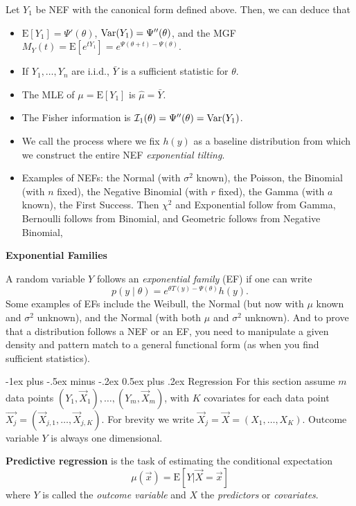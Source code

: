 \documentclass[10pt,landscape]{article}
\makeatletter
\renewcommand{\section}{\@startsection{section}{1}{0mm}%
                                {-1ex plus -.5ex minus -.2ex}%
                                {0.5ex plus .2ex}%
                                {\normalfont\large\bfseries}}
\newcommand{\E}{\text{E}}
\makeatother
\begin{document}
\begin{multicols*}{3}
Let $Y_1$ be NEF with the canonical form defined above. Then, we can deduce that 
\begin{itemize}
    \item $\E [Y_1]=\Psi'(\theta)$, $\operatorname{Var}( Y_1)=\Psi''(\theta)$, and the MGF $M_Y(t)=\E[e^{tY_1}]=e^{\Psi(\theta+t)-\Psi(\theta)}$.
    \item If $Y_1,\dots,Y_n$ are i.i.d., $\bar{Y}$ is a sufficient statistic for $\theta$.
    \item The MLE of $\mu=\E [Y_1]$ is $\hat{\mu}=\bar{Y}$.
    \item The Fisher information is $\mathcal{I}_1(\theta)=\Psi''(\theta)=\operatorname{Var}(Y_1)$.
    \item We call the process where we fix $h(y)$ as a baseline distribution from which we construct the entire NEF \emph{exponential tilting}.
    \item Examples of NEFs: the Normal (with $\sigma^2$ known), the Poisson, the Binomial (with $n$ fixed), the Negative Binomial (with $r$ fixed), the Gamma (with $a$ known), the First Success. Then $\chi^2$ and Exponential follow from Gamma, Bernoulli follows from Binomial, and Geometric follows from Negative Binomial,
\end{itemize}

\textbf{Exponential Families}

A random variable $Y$ follows an \emph{exponential family} (EF) if one can write $$p(y\mid \theta)=e^{\theta T(y)-\Psi(\theta)}h(y).$$ Some examples of EFs include the Weibull, the Normal (but now with $\mu$ known and $\sigma^2$ unknown), and the Normal (with both $\mu$ and $\sigma^2$ unknown). And to prove that a distribution follows a NEF or an EF, you need to manipulate a given density and pattern match to a general functional form (as when you find sufficient statistics).


\section{Regression}
For this section assume $m$ data points $(Y_1,\vec{X}_1),\ldots,(Y_m,\vec{X}_m)$, with $K$ covariates for each data point $\vec{X_j}=(\vec{X}_{j,1},\ldots,\vec{X}_{j,K})$. For brevity we write $\vec{X}_j=\vec{X}=(X_{1},\ldots,X_{K})$. Outcome variable $Y$ is always one dimensional.

\textbf{Predictive regression} is the task of estimating the conditional expectation
$$
\mu(\vec{x})=\E[Y|\vec{X}=\vec{x}]
$$
where $Y$ is called the \emph{outcome variable} and $X$ the \emph{predictors} or \emph{covariates}.


\end{multicols*}
\end{document}
